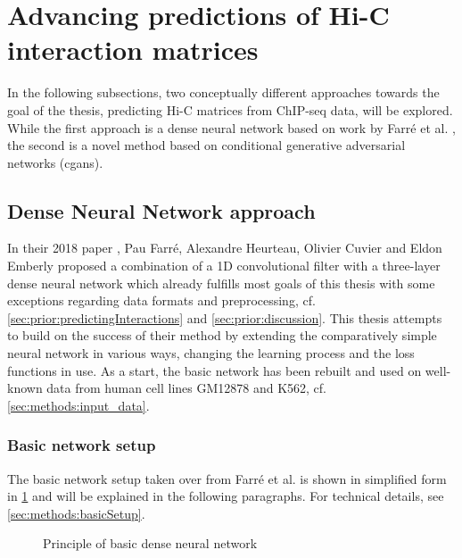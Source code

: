 \section{Advancing predictions of Hi-C interaction matrices}
In the following subsections, two conceptually different approaches towards the goal of the thesis,
predicting Hi-C matrices from ChIP-seq data, will be explored.
While the first approach is a dense neural network based on work by Farr\'e et al. \cite{Farre2018a},
the second is a novel method based on conditional generative adversarial networks (\acrshort{cgan}s).

\subsection{Dense Neural Network approach}\label{sec:improve:DNNapproach}
In their 2018 paper \cite{Farre2018a}, Pau Farr\'e, Alexandre Heurteau, Olivier Cuvier and Eldon Emberly
proposed a combination of a 1D convolutional filter with a three-layer dense neural network 
which already fulfills most goals of this thesis with some exceptions regarding data formats and preprocessing, 
cf. \cref{sec:prior:predictingInteractions} and \ref{sec:prior:discussion}.
This thesis attempts to build on the success of their method by extending the comparatively simple neural network
in various ways, changing the learning process and the loss functions in use.
As a start, the basic network has been rebuilt and used on well-known data from human cell lines GM12878 and K562, cf. \cref{sec:methods:input_data}.

\subsubsection{Basic network setup} \label{sec:improve:basicNetwork}
The basic network setup taken over from Farr\'e et al. \cite{Farre2018a} is shown in simplified form in \cref{fig:improve:priciple_basic_dnn}
and will be explained in the following paragraphs. For technical details, see \cref{sec:methods:basicSetup}.
\begin{figure}[hbp]
    \small
    \centering
    \caption{Principle of basic dense neural network}
    \label{fig:improve:priciple_basic_dnn}
\end{figure}

